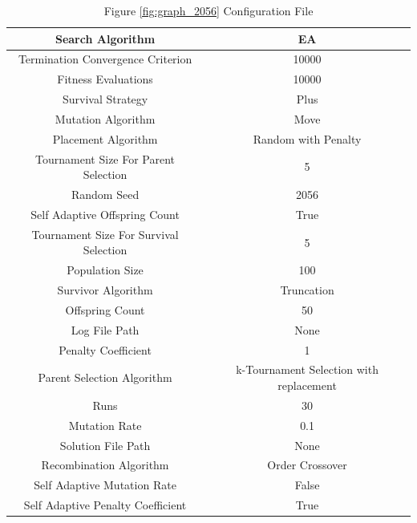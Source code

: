 \documentclass{standalone}
\begin{document}
\begin{table}[!htb]
	\centering
	\caption{Figure \ref{fig:graph_2056} Configuration File}
	\label{tab:graph_2056}
	\begin{tabular}{| c | c |}
		\hline
		Search Algorithm		& EA		 \\
		\hline
		Termination Convergence Criterion		& 10000		 \\
		\hline
		Fitness Evaluations		& 10000		 \\
		\hline
		Survival Strategy		& Plus		 \\
		\hline
		Mutation Algorithm		& Move		 \\
		\hline
		Placement Algorithm		& Random with Penalty		 \\
		\hline
		Tournament Size For Parent Selection		& 5		 \\
		\hline
		Random Seed		& 2056		 \\
		\hline
		Self Adaptive Offspring Count		& True		 \\
		\hline
		Tournament Size For Survival Selection		& 5		 \\
		\hline
		Population Size		& 100		 \\
		\hline
		Survivor Algorithm		& Truncation		 \\
		\hline
		Offspring Count		& 50		 \\
		\hline
		Log File Path		& None		 \\
		\hline
		Penalty Coefficient		& 1		 \\
		\hline
		Parent Selection Algorithm		& k-Tournament Selection with replacement		 \\
		\hline
		Runs		& 30		 \\
		\hline
		Mutation Rate		& 0.1		 \\
		\hline
		Solution File Path		& None		 \\
		\hline
		Recombination Algorithm		& Order Crossover		 \\
		\hline
		Self Adaptive Mutation Rate		& False		 \\
		\hline
		Self Adaptive Penalty Coefficient		& True		 \\
		\hline
	\end{tabular}
\end{table}
\end{document}
